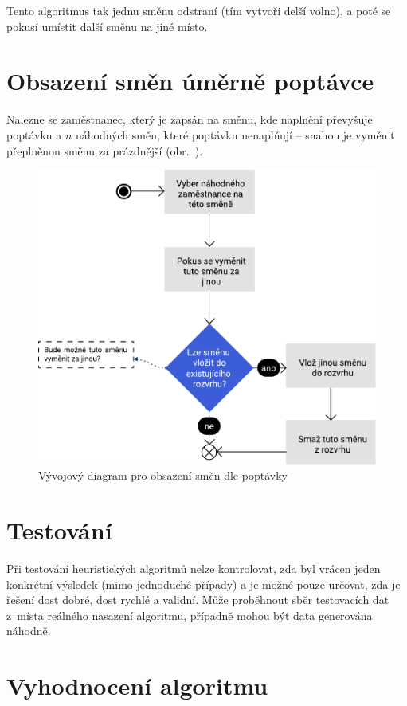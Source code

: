\documentclass[twoside]{ctuthesis}
\begin{document}
Tento algoritmus tak jednu směnu odstraní (tím vytvoří delší volno), a poté se pokusí umístit další směnu na jiné místo.

\section{Obsazení směn úměrně poptávce}
Nalezne se zaměstnanec, který je zapsán na směnu, kde naplnění převyšuje poptávku a $n$ náhodných směn, které poptávku nenaplňují – snahou je vyměnit přeplněnou směnu za prázdnější (obr.~).

\begin{figure}
	\includegraphics[scale=0.7]{img/demand-fulfill.pdf}
	\caption{Vývojový diagram pro obsazení směn dle poptávky}
	\label{fig:freedays}
\end{figure}


\section{Testování}

Při testování heuristických algoritmů nelze kontrolovat, zda byl vrácen jeden konkrétní výsledek (mimo jednoduché případy) a je možné pouze určovat, zda je řešení dost dobré, dost rychlé a validní. Může proběhnout sběr testovacích dat z~místa reálného nasazení algoritmu, případně mohou být data generována náhodně. \cite{rardin2001experimental}


\section{Vyhodnocení algoritmu}
\end{document}
